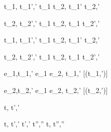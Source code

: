   {t_1,\sigma {} t_1',\sigma'}
  {t_1 \Pair t_2,\sigma {} t_1' \Pair t_2,\sigma'}

  {t_2,\sigma {} t_2',\sigma'}
  {t_1 \Pair t_2,\sigma {} t_1 \Pair t_2',\sigma'}


  {t_1,\sigma {} t_1',\sigma'}
  {t_1 \Choose t_2,\sigma {} t_1' \Choose t_2,\sigma'}

  {t_2,\sigma {} t_2',\sigma' }
  {t_1 \Choose t_2,\sigma {} t_1 \Choose t_2',\sigma'}


  {e_1,\sigma \normalise t_1,\sigma'}
  {e_1 \Pick e_2,\sigma \xrightarrow[]{\Left} t_1,\sigma'}
  [\neg\Failing(t_1,\sigma')]

  {e_2,\sigma \normalise t_2,\sigma'}
  {e_1 \Pick e_2,\sigma \xrightarrow[]{\Right} t_2,\sigma'}
  [\neg\Failing(t_2,\sigma')]




  {t,\sigma {} t',\sigma'}



  {t,\sigma {} t',\sigma' \Quad
   t',\sigma' \normalise t'',\sigma''}
  {t,\sigma {} t'',\sigma''}
